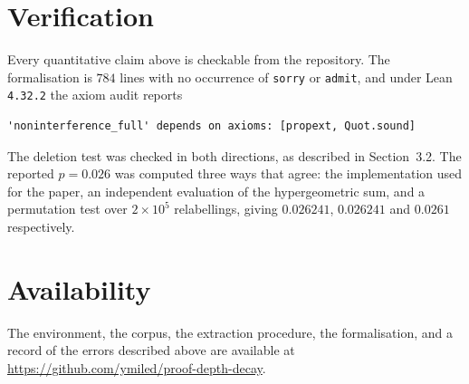 \documentclass[11pt]{article}
\begin{document}
\section*{Verification}

Every quantitative claim above is checkable from the repository. The
formalisation is $784$ lines with no occurrence of \verb|sorry| or
\verb|admit|, and under Lean \verb|4.32.2| the axiom audit reports

\begin{lstlisting}
'noninterference_full' depends on axioms: [propext, Quot.sound]
\end{lstlisting}

The deletion test was checked in both directions, as described in Section~3.2.
The reported $p = 0.026$ was computed three ways that agree: the implementation
used for the paper, an independent evaluation of the hypergeometric sum, and a
permutation test over $2\times10^{5}$ relabellings, giving $0.026241$,
$0.026241$ and $0.0261$ respectively.

\section*{Availability}

The environment, the corpus, the extraction procedure, the formalisation, and a
record of the errors described above are available at
\url{https://github.com/ymiled/proof-depth-decay}.
\end{document}
